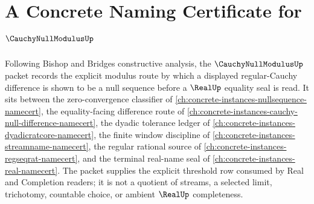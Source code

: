 \chapter{A Concrete Naming Certificate for $\CauchyNullModulusUp$}
\label{ch:concrete-instances-cauchy-null-modulus-namecert}

Following Bishop and Bridges constructive analysis, the $\CauchyNullModulusUp$ packet records the explicit modulus route by which a displayed regular-Cauchy difference is shown to be a null sequence before a $\RealUp$ equality seal is read. It sits between the zero-convergence classifier of \autoref{ch:concrete-instances-nullsequence-namecert}, the equality-facing difference route of \autoref{ch:concrete-instances-cauchy-null-difference-namecert}, the dyadic tolerance ledger of \autoref{ch:concrete-instances-dyadicratcore-namecert}, the finite window discipline of \autoref{ch:concrete-instances-streamname-namecert}, the regular rational source of \autoref{ch:concrete-instances-regseqrat-namecert}, and the terminal real-name seal of \autoref{ch:concrete-instances-real-namecert}. The packet supplies the explicit threshold row consumed by Real and Completion readers; it is not a quotient of streams, a selected limit, trichotomy, countable choice, or ambient $\RealUp$ completeness.

